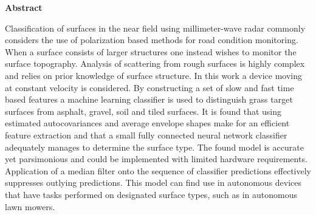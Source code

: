 \newenvironment{abstract}%
    {\cleardoublepage\thispagestyle{empty}\null\vfill\begin{center}%
    \bfseries{\textsf{Abstract}}\end{center}}%
    {\vfill\null}
\begin{abstract}
Classification of surfaces in the near field using millimeter-wave radar commonly considers the use of polarization based methods for road condition monitoring. When a surface consists of larger structures one instead wishes to monitor the surface topography. Analysis of scattering from rough surfaces is highly complex and relies on prior knowledge of surface structure. In this work a device moving at constant velocity is considered. By constructing a set of slow and fast time based features a machine learning classifier is used to distinguish grass target surfaces from asphalt, gravel, soil and tiled surfaces. It is found that using estimated autocovariances and average envelope shapes make for an efficient feature extraction and that a small fully connected neural network classifier adequately manages to determine the surface type. The found model is accurate yet parsimonious and could be implemented with limited hardware requirements. Application of a median filter onto the sequence of classifier predictions effectively suppresses outlying predictions. This model can find use in autonomous devices that have tasks performed on designated surface types, such as in autonomous lawn mowers. 
	


\end{abstract}
